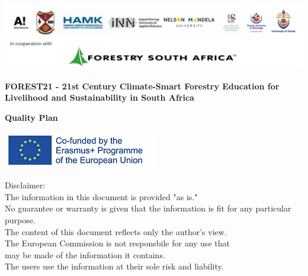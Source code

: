 \documentclass[
  11pt,
]{article}
\author{}
\date{\vspace{-2.5em}}
\begin{document}
\subsectionfont{\raggedright}
\subsubsectionfont{\raggedright}


\begin{centering}

\vspace{3cm}


\includegraphics[width=1\linewidth]{Partner_logos} 

\vspace{3cm}

\Large
{\bf FOREST21 - 21st Century Climate-Smart Forestry Education for Livelihood
  and Sustainability in South Africa}
  
\vspace{2cm}

\Large
{\bf Quality Plan}

\vspace{4cm}

\normalsize
\singlespacing


\includegraphics[width=1\linewidth]{EU_logo} 

\vspace{0.5 cm}

Disclaimer:\\
The information in this document is provided "as is."\\
No guarantee or warranty is given that the information is fit for any particular purpose.\\
The content of this document reflects only the author's view.\\
The European Commission is not responsbile for any use that\\
may be made of the information it contains.\\
The users use the information at their sole risk and liability.

\vspace{1.5 cm}

\end{centering}
\end{document}
